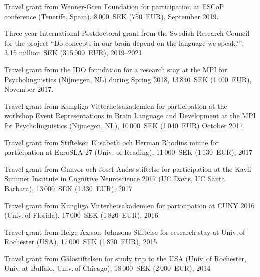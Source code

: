 \documentclass[margin, 11pt]{res} %
\begin{document}
\begin{resume}
Travel grant from Wenner-Gren Foundation for participation at ESCoP conference (Tenerife, Spain), 8\,000~SEK (750~EUR), September 2019.

Three-year International Postdoctoral grant from the Swedish Research Council for the project ``Do concepts in our brain depend on the language we speak?'', 3.15 million~SEK (315\,000~EUR), 2019--2021.

Travel grant from the IDO foundation for a research stay at the MPI for Psycholinguistics (Nijmegen, NL) during Spring 2018, 13\,840~SEK (1\,400~EUR), November 2017.

Travel grant from Kungliga Vitterhetsakademien for participation at the workshop Event Representations in Brain Language and Development at the MPI for Psycholinguistics (Nijmegen, NL), 10\,000~SEK (1\,040~EUR) October 2017.

Travel grant from Stiftelsen Elisabeth och Herman Rhodins minne for participation at EuroSLA 27 (Univ. of Reading), 11\,000~SEK (1\,130~EUR), 2017

Travel grant from Gunvor och Josef An\'{e}rs stiftelse for participation at the Kavli Summer Institute in Cognitive Neuroscience 2017 (UC Davis, UC Santa Barbara), 13\,000~SEK (1\,330~EUR), 2017

Travel grant from Kungliga Vitterhetsakademien for participation at CUNY 2016 (Univ.\,of Florida), 17\,000~SEK (1\,820~EUR), 2016

Travel grant from Helge Ax:son Johnsons Stiftelse for research stay at Univ.\,of Rochester (USA), 17\,000~SEK (1\,820~EUR), 2015

Travel grant from G\aa l\"{o}stiftelsen for study trip to the USA (Univ.\,of Rochester, Univ.\,at Buffalo, Univ.\,of Chicago), 18\,000~SEK (2\,000~EUR), 2014
 












\end{resume}
\end{document}
